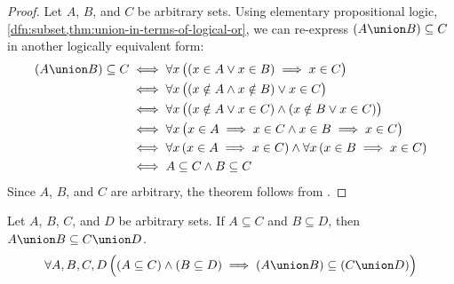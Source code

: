 \begin{proof}
    Let \( A \), \( B \), and \( C \) be arbitrary sets. Using elementary propositional logic, \cref{dfn:subset,thm:union-in-terms-of-logical-or},
    we can re-express \( \mleft( A \union B \mright) \subseteq C \) in another logically equivalent form:
    \begin{align*}
        \mleft( A \union B \mright) \subseteq C
        &\iff
        \forall x \, \big( \mleft( x \in A \lor x \in B \mright)
        \implies x \in C \big)\\
        &\iff
        \forall x \, \big( \mleft( x \notin A \land x \notin B \mright) \lor x \in C \big)\\
        &\iff
        \forall x \, \big( \mleft( x \notin A \lor x \in C \mright)
        \land
        \mleft( x \notin B \lor x \in C \mright) \big)\\
        &\iff
        \forall x \, \big( x \in A \implies x \in C \land x \in B \implies x \in C \big)\\
        &\iff
        \forall x \, \mleft( x \in A \implies x \in C \mright) \land
        \forall x \, \mleft( x \in B \implies x \in C  \mright)\\
        &\iff
        A \subseteq C \land B \subseteq C
    \end{align*}
    Since \( A \), \( B \), and \( C \) are arbitrary, the theorem follows from .
\end{proof}

\begin{thm}
    \label{thm:the-union-of-subsets-is-a-subset-of-the-union}
    Let \( A \), \( B \), \( C \), and \( D \) be arbitrary sets. If \( A \subseteq C \) and \( B \subseteq D \), then
    \( A \union B \subseteq C \union D \).
    \begin{equation*}
        \forall A,B,C,D \, \Big( \mleft( A \subseteq C \mright) \land \mleft( B \subseteq D \mright) \implies
        \mleft( A \union B \mright) \subseteq \mleft( C \union D \mright) \Big)
    \end{equation*}
\end{thm}


